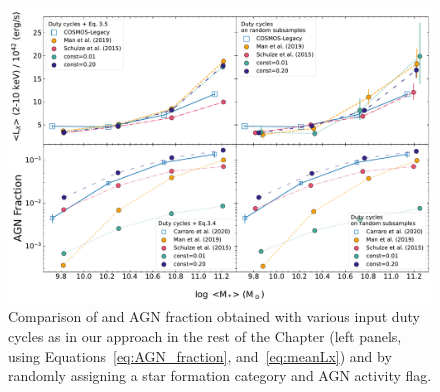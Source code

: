 \begin{figure}
\begin{center}
  \includegraphics[width=\linewidth]{Figs/Chapter3/test_mean_subsamples.pdf}
  \caption{Comparison of \LX{} and AGN fraction obtained with various input duty cycles as in our approach in the rest of the Chapter (left panels, using Equations~\ref{eq:AGN_fraction}, and~\ref{eq:meanLx}) and by randomly assigning a star formation category and AGN activity flag.
  }
    \label{fig:test_subsamples}
\end{center}
\end{figure}

